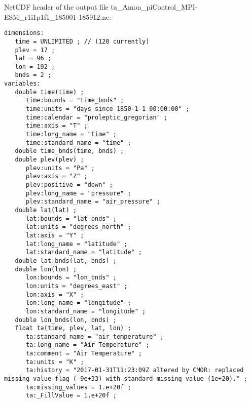 NetCDF header of the output file ta\_Amon\_piControl\_MPI-ESM\_r1i1p1f1\_185001-185912.nc:
\begin{lstlisting}[frame=single, backgroundcolor=\color{pcolor1}, basicstyle=\footnotesize]
dimensions:
   time = UNLIMITED ; // (120 currently)
   plev = 17 ;
   lat = 96 ;
   lon = 192 ;
   bnds = 2 ;
variables:
   double time(time) ;
      time:bounds = "time_bnds" ;
      time:units = "days since 1850-1-1 00:00:00" ;
      time:calendar = "proleptic_gregorian" ;
      time:axis = "T" ;
      time:long_name = "time" ;
      time:standard_name = "time" ;
   double time_bnds(time, bnds) ;
   double plev(plev) ;
      plev:units = "Pa" ;
      plev:axis = "Z" ;
      plev:positive = "down" ;
      plev:long_name = "pressure" ;
      plev:standard_name = "air_pressure" ;
   double lat(lat) ;
      lat:bounds = "lat_bnds" ;
      lat:units = "degrees_north" ;
      lat:axis = "Y" ;
      lat:long_name = "latitude" ;
      lat:standard_name = "latitude" ;
   double lat_bnds(lat, bnds) ;
   double lon(lon) ;
      lon:bounds = "lon_bnds" ;
      lon:units = "degrees_east" ;
      lon:axis = "X" ;
      lon:long_name = "longitude" ;
      lon:standard_name = "longitude" ;
   double lon_bnds(lon, bnds) ;
   float ta(time, plev, lat, lon) ;
      ta:standard_name = "air_temperature" ;
      ta:long_name = "Air Temperature" ;
      ta:comment = "Air Temperature" ;
      ta:units = "K" ;
      ta:history = "2017-01-31T11:23:09Z altered by CMOR: replaced missing value flag (-9e+33) with standard missing value (1e+20)." ;
      ta:missing_values = 1.e+20f ;
      ta:_FillValue = 1.e+20f ;


\end{lstlisting}

